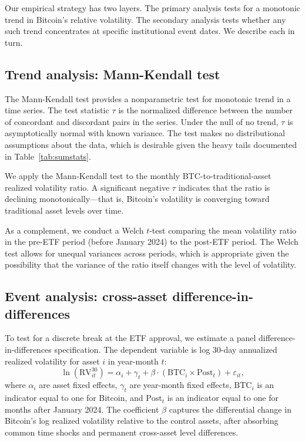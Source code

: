 \documentclass[12pt,a4paper]{article}
\begin{document}
Our empirical strategy has two layers. The primary analysis tests for a
monotonic trend in Bitcoin's relative volatility. The secondary analysis
tests whether any such trend concentrates at specific institutional event
dates. We describe each in turn.

\subsection{Trend analysis: Mann-Kendall test}\label{sec:meth-mk}

The Mann-Kendall test \citep{mann1945nonparametric, kendall1975rank}
provides a nonparametric test for monotonic trend in a time series. The
test statistic $\tau$ is the normalized difference between the number of
concordant and discordant pairs in the series. Under the null of no trend,
$\tau$ is asymptotically normal with known variance. The test makes no
distributional assumptions about the data, which is desirable given the
heavy tails documented in Table~\ref{tab:sumstats}.

We apply the Mann-Kendall test to the monthly BTC-to-traditional-asset
realized volatility ratio. A significant negative $\tau$ indicates that the
ratio is declining monotonically---that is, Bitcoin's volatility is
converging toward traditional asset levels over time.

As a complement, we conduct a Welch $t$-test comparing the mean volatility
ratio in the pre-ETF period (before January 2024) to the post-ETF period.
The Welch test allows for unequal variances across periods, which is
appropriate given the possibility that the variance of the ratio itself
changes with the level of volatility.

\subsection{Event analysis: cross-asset difference-in-differences}\label{sec:meth-did}

To test for a discrete break at the ETF approval, we estimate a panel
difference-in-differences specification. The dependent variable is log
30-day annualized realized volatility for asset $i$ in year-month $t$:
\begin{equation}\label{eq:did}
  \ln(\text{RV}^{30}_{it}) = \alpha_i + \gamma_t + \beta \cdot
  (\text{BTC}_i \times \text{Post}_t) + \varepsilon_{it},
\end{equation}
where $\alpha_i$ are asset fixed effects, $\gamma_t$ are year-month fixed
effects, $\text{BTC}_i$ is an indicator equal to one for Bitcoin, and
$\text{Post}_t$ is an indicator equal to one for months after January 2024.
The coefficient $\beta$ captures the differential change in Bitcoin's log
realized volatility relative to the control assets, after absorbing
common time shocks and permanent cross-asset level differences.
\end{document}
